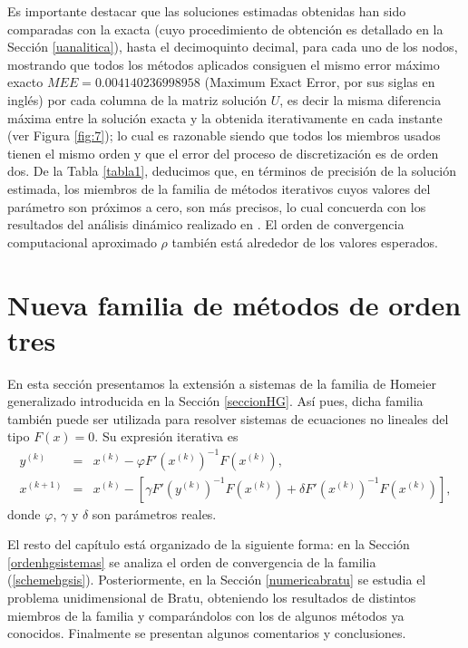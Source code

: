 Es importante destacar que las soluciones estimadas obtenidas han sido comparadas con la exacta (cuyo procedimiento de obtención es detallado en la Sección \ref{uanalitica}), hasta el decimoquinto decimal, para cada uno de los nodos, mostrando que todos los métodos aplicados consiguen el mismo error máximo exacto $MEE=0.004140236998958$ (Maximum Exact Error, por sus siglas en inglés) por cada columna de la matriz solución $U$, es decir la misma diferencia máxima entre la solución exacta y la obtenida iterativamente en cada instante (ver Figura \ref{fig:7}); lo cual es razonable siendo que todos los miembros usados tienen el mismo orden y que el error del proceso de discretización es de orden dos. De la Tabla \ref{tabla1}, deducimos que, en términos de precisión de la solución estimada, los miembros de la familia de métodos iterativos cuyos valores del parámetro son próximos a cero, son más precisos, lo cual concuerda con los resultados del análisis dinámico realizado en \cite{napoles}. El orden de convergencia computacional aproximado $\rho$ también está alrededor de los valores esperados.	

\section{Nueva familia de métodos de orden tres}\label{seccionHGsistemas}
En esta sección presentamos la extensión a sistemas de la familia de Homeier generalizado introducida en la Sección \ref{seccionHG}. Así pues, dicha familia también puede ser utilizada para resolver sistemas de ecuaciones no lineales del tipo $F(x)=0$. Su expresión iterativa es
\begin{equation} \label{schemehgsis}
	\begin{array} {rcl}
		y^{(k)}  & = & x^{(k)}- \varphi F'(x^{(k)})^{-1} F(x^{(k)}), \\
		x^{(k+1)}& = & x^{(k)}-\left[ \gamma F'(y^{(k)})^{-1} F(x^{(k)})+ \delta F'(x^{(k)})^{-1} F(x^{(k)}) \right],
	\end{array}
\end{equation}
donde $\varphi$, $\gamma$ y $\delta$ son parámetros reales.

El resto del capítulo está organizado de la siguiente forma: en la Sección \ref{ordenhgsistemas} se analiza el orden de convergencia de la familia (\ref{schemehgsis}). Posteriormente, en la Sección \ref{numericabratu} se estudia el problema unidimensional de Bratu, obteniendo los resultados de distintos miembros de la familia y comparándolos con los de algunos métodos ya conocidos. Finalmente se presentan algunos comentarios y conclusiones.

